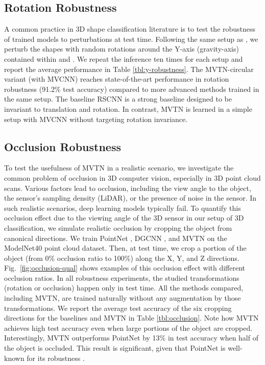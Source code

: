 \documentclass[10pt,twocolumn,letterpaper]{article}
\newcommand{\figLabel}{Fig.~}
\begin{document}
\subsection{Rotation Robustness} \label{sec:exp-robust}
\vspace{-4pt}
A common practice in 3D shape classification literature is to test the robustness of trained models to perturbations at test time. Following the same setup as \cite{rspointcloud,sada}, we perturb the shapes with random rotations around the Y-axis (gravity-axis) contained within  and . 
We repeat the inference ten times for each setup and report the average performance in Table \ref{tbl:y-robustness}. The MVTN-circular variant (with MVCNN) reaches state-of-the-art performance in rotation robustness (91.2\% test accuracy) compared to more advanced methods trained in the same setup. The baseline RSCNN \cite{rspointcloud} is a strong baseline designed to be invariant to translation and rotation. In contrast, MVTN is learned in a simple setup with MVCNN without targeting rotation invariance.


\subsection{Occlusion Robustness} \label{sec:occlusion}
\vspace{-4pt}
To test the usefulness of MVTN in a realistic scenario, we investigate the common problem of occlusion in 3D computer vision, especially in 3D point cloud scans. Various factors lead to occlusion, including the view angle to the object, the sensor's sampling density (\eg LiDAR), or the presence of noise in the sensor. In such realistic scenarios, deep learning models typically fail. To quantify this occlusion effect due to the viewing angle of the 3D sensor in our setup of 3D classification, we simulate realistic occlusion by cropping the object from canonical directions. We train PointNet \cite{pointnet}, DGCNN \cite{dgcn}, and MVTN on the ModelNet40 point cloud dataset. Then, at test time, we crop a portion of the object (from 0\% occlusion ratio to 100\%) along the X, Y, and Z directions. \figLabel{\ref{fig:occlusion-qual}} shows examples of this occlusion effect with different occlusion ratios. In all robustness experiments, the studied transformations (rotation or occlusion) happen only in test time. All the methods compared, including MVTN, are trained naturally without any augmentation by those transformations. We report the average test accuracy of the six cropping directions for the baselines and MVTN in Table \ref{tbl:occlusion}. Note how MVTN achieves high test accuracy even when large portions of the object are cropped. Interestingly, MVTN outperforms PointNet \cite{pointnet} by 13\% in test accuracy when half of the object is occluded. This result is significant, given that PointNet is well-known for its robustness \cite{pointnet,advpc}. 
\end{document}

